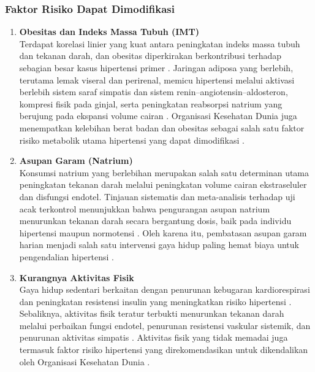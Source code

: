 \subsubsection{Faktor Risiko Dapat Dimodifikasi}
\begin{enumerate}
    \item \textbf{Obesitas dan Indeks Massa Tubuh (IMT)}\\
    Terdapat korelasi linier yang kuat antara peningkatan indeks massa tubuh dan tekanan darah, dan obesitas diperkirakan berkontribusi terhadap sebagian besar kasus hipertensi primer \autocite{Parvanova2024}. Jaringan adiposa yang berlebih, terutama lemak viseral dan perirenal, memicu hipertensi melalui aktivasi berlebih sistem saraf simpatis dan sistem renin--angiotensin--aldosteron, kompresi fisik pada ginjal, serta peningkatan reabsorpsi natrium yang berujung pada ekspansi volume cairan \autocite{Parvanova2024}. Organisasi Kesehatan Dunia juga menempatkan kelebihan berat badan dan obesitas sebagai salah satu faktor risiko metabolik utama hipertensi yang dapat dimodifikasi \autocite{WHO2023}.

    \item \textbf{Asupan Garam (Natrium)}\\
    Konsumsi natrium yang berlebihan merupakan salah satu determinan utama peningkatan tekanan darah melalui peningkatan volume cairan ekstraseluler dan disfungsi endotel. Tinjauan sistematis dan meta-analisis terhadap uji acak terkontrol menunjukkan bahwa pengurangan asupan natrium menurunkan tekanan darah secara bergantung dosis, baik pada individu hipertensi maupun normotensi \autocite{Huang2020Sodium}. Oleh karena itu, pembatasan asupan garam harian menjadi salah satu intervensi gaya hidup paling hemat biaya untuk pengendalian hipertensi \autocite{WHO2023}.

    \item \textbf{Kurangnya Aktivitas Fisik}\\
    Gaya hidup sedentari berkaitan dengan penurunan kebugaran kardiorespirasi dan peningkatan resistensi insulin yang meningkatkan risiko hipertensi \autocite{Hayes2022Physical}. Sebaliknya, aktivitas fisik teratur terbukti menurunkan tekanan darah melalui perbaikan fungsi endotel, penurunan resistensi vaskular sistemik, dan penurunan aktivitas simpatis \autocite{Hayes2022Physical}. Aktivitas fisik yang tidak memadai juga termasuk faktor risiko hipertensi yang direkomendasikan untuk dikendalikan oleh Organisasi Kesehatan Dunia \autocite{WHO2023}.


\end{enumerate}
